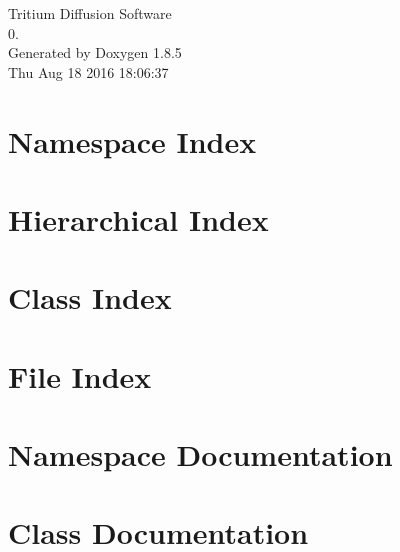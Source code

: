 \documentclass[twoside]{book}
\newcommand{\clearemptydoublepage}{%
  \newpage{\pagestyle{empty}\cleardoublepage}%
}
\begin{document}
\hypersetup{pageanchor=false}
\begin{titlepage}
\vspace*{7cm}
\begin{center}%
{\Large Tritium Diffusion Software \\[1ex]\large 0. }\\
\vspace*{1cm}
{\large Generated by Doxygen 1.8.5}\\
\vspace*{0.5cm}
{\small Thu Aug 18 2016 18:06:37}\\
\end{center}
\end{titlepage}
\clearemptydoublepage
\tableofcontents
\clearemptydoublepage
{}
\hypersetup{pageanchor=true}

\chapter{Namespace Index}

\chapter{Hierarchical Index}

\chapter{Class Index}

\chapter{File Index}

\chapter{Namespace Documentation}

\chapter{Class Documentation}






















\end{document}
